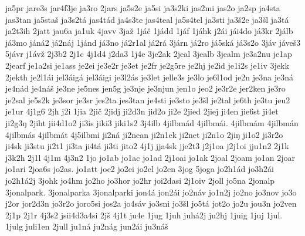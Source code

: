 {    ja5pr
    jare3s
    jar4f3je
    ja3ro
    2jars
    ja5s2e
    ja5si
    ja3s2ki
    jas2mi
    jas2o
    ja2sp
    ja4sta
    jas3tan
    ja5staš
    ja3s2tá
    jas4tád
    ja4s3te
    jas4teal
    ja5s4tel
    ja3sti
    ja3š2e
    ja3šl
    ja3tá
    ja2t3ih
    2jatt
    jau6a
    ja1uk
    4javv
    3jaž
    1jáč
    1jádd
    1jáf
    1jáhk
    j2ái
    jái4do
    já3kr
    2jálb
    já3mo
    jáná2
    já2náj
    1jánd
    já3no
    já2r1al
    já2rá
    3járn
    já2ro
    já5ská
    já3s2o
    3jáv
    jáveš3
    5jávr
    j1ávž
    2j3b2
    2j1c
    4j1d4
    j2da3
    1j4e
    3je2ak
    2jeal
    3jealb
    3jealm
    je3a2nu
    je1ap
    2jearf
    je1a2si
    je1ass
    je2ei
    je3e2r
    je3et
    je2fr
    je2g5re
    je2hj
    je2id
    je1i2s
    je1iv
    3jekk
    2jekth
    je2l1ái
    jel3áigá
    jel3áigi
    je3l2ás
    je3let
    jelle3s
    je3lo
    je6l1od
    je2n
    je3na
    je3ná
    je4nád
    je4náš
    je3ne
    je5nes
    jen5g
    je3nje
    je3njun
    jen1o
    jeo2
    je3r2e
    jer2ken
    je3ro
    je2sal
    je5s2k
    je3sor
    je3sr
    jes2ta
    jes3tan
    je4sti
    je3sto
    je3šl
    je2tal
    je6th
    je3tu
    jeu2
    je1ur
    4j1g6
    2jh
    j2i
    1jia
    2jič
    2jidj
    ji2d3n
    jid2o
    ji2e
    2jied
    2jiej
    ji4en
    jie6st
    ji4et
    ji2g3ŋ
    2jiht
    jii4d1o2
    ji3is
    jiki3
    jiki1s2
    3j4ilb
    4jilbmád
    4jilbmái.
    4jilbmám
    4jilbmán
    4jilbmás
    4jilbmát
    4j5ilbmi
    ji2ná
    ji2nean
    ji2n1ek
    ji2net
    ji2n1o
    2jiŋ
    ji1o2
    ji3r2o
    ji4sk
    ji3stu
    ji2t1
    ji3ta
    ji4tá
    ji3ti
    jito2
    4j1j
    jja4sk
    jje2t3
    j2j1oa
    j2j1oi
    jju1n2
    2j1k
    j3k2h
    2j1l
    4j1m
    4j3n2
    1jo
    jo1ab
    jo1ac
    jo1ad
    2j1oai
    jo1ak
    2joal
    2joam
    jo1an
    2joar
    jo1ari
    2joa6s
    jo2as.
    jo1att
    joe2
    jo2ei
    jo2el
    jo2en
    3jog
    5joga
    jo2h1ád
    jo3h2ái
    jo2h1á2j
    3johk
    jo4hm
    jo2ho
    jo3hor
    jo2hr
    joi2dasi
    2j1oiv
    2joll
    jo5na
    2jonalp
    3jonalpark.
    3jonalparka
    3jonalparki
    jon4á
    jon2ái
    jo2náv
    jo1n2j
    jo2no
    jo3nov
    jo3o
    j2or
    jor2d3n
    jo3r2o
    joro5si
    jos2a
    jo4sáv
    jo3sni
    jo3šl
    jo5tá
    jot2o
    jo2u
    jou3n
    jo2ven
    2j1p
    2j1r
    4j3s2
    jsii4d3a4si
    2jš
    4j1t
    ju4e
    1jug
    1juh
    juhá2j
    ju2hj
    1juig
    1juj
    1jul.
    1julg
    juli1en
    2jull
    ju1ná
    ju2nág
    jun2ái
    ju3náš
}
